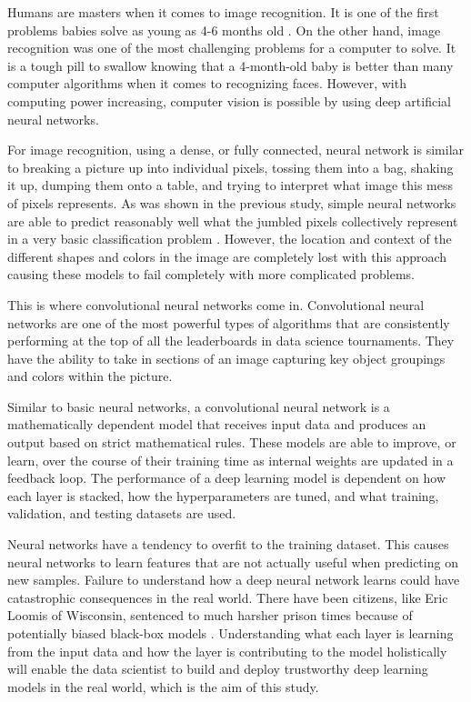 \documentclass[5p,authoryear]{elsarticle}
\begin{document}
Humans are masters when it comes to image recognition. It is one of the first problems babies solve as young as 4-6 months old \citep{baby}. On the other hand, image recognition was one of the most challenging problems for a computer to solve. It is a tough pill to swallow knowing that a 4-month-old baby is better than many computer algorithms when it comes to recognizing faces. However, with computing power increasing, computer vision is possible by using deep artificial neural networks.

For image recognition, using a dense, or fully connected, neural network is similar to breaking a picture up into individual pixels, tossing them into a bag, shaking it up, dumping them onto a table, and trying to interpret what image this mess of pixels represents. As was shown in the previous study, simple neural networks are able to predict reasonably well what the jumbled pixels collectively represent in a very basic classification problem \citep{jason}. However, the location and context of the different shapes and colors in the image are completely lost with this approach causing these models to fail completely with more complicated problems. 

This is where convolutional neural networks come in. Convolutional neural networks are one of the most powerful types of algorithms that are consistently performing at the top of all the leaderboards in data science tournaments. They have the ability to take in sections of an image capturing key object groupings and colors within the picture. 

Similar to basic neural networks, a convolutional neural network is a mathematically dependent model that receives input data and produces an output based on strict mathematical rules. These models are able to improve, or learn, over the course of their training time as internal weights are updated in a feedback loop. The performance of a deep learning model is dependent on how each layer is stacked, how the hyperparameters are tuned, and what training, validation, and testing datasets are used. 

Neural networks have a tendency to overfit to the training dataset. This causes neural networks to learn features that are not actually useful when predicting on new samples. Failure to understand how a deep neural network learns could have catastrophic consequences in the real world. There have been citizens, like Eric Loomis of Wisconsin, sentenced to much harsher prison times because of potentially biased black-box models \citep{prison}. Understanding what each layer is learning from the input data and how the layer is contributing to the model holistically will enable the data scientist to build and deploy trustworthy deep learning models in the real world, which is the aim of this study.
\end{document}
